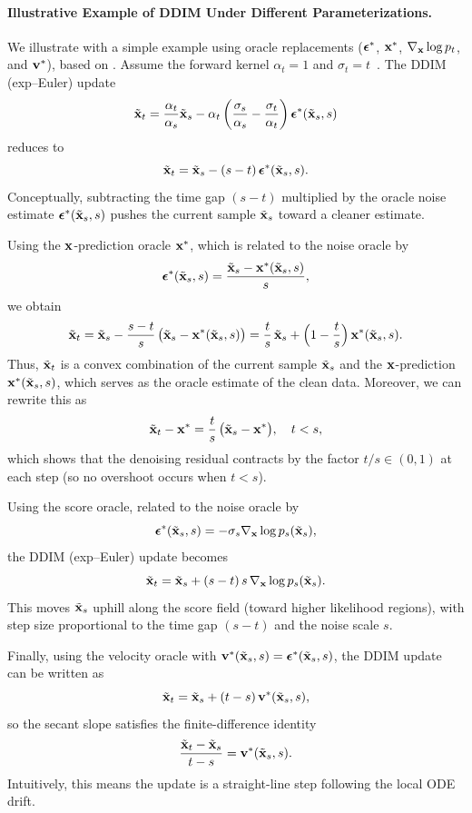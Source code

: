 \paragraph{Illustrative Example of DDIM Under Different Parameterizations.}
We illustrate with a simple example using oracle replacements (${\bm{\epsilon}}^*$, ${\mathbf{x}}^*$, $\nabla_{\mathbf{x}}\log p_t$, and ${\mathbf{v}}^*$), based on .  
Assume the forward kernel $\alpha_t=1$ and $\sigma_t=t$~\citep{karras2022elucidating}. The DDIM (exp--Euler) update
\[
\tilde{{\mathbf{x}}}_{t} = \frac{\alpha_{t}}{\alpha_{s}}\tilde{{\mathbf{x}}}_{s}
- \alpha_{t} \left(\frac{\sigma_{s}}{\alpha_{s}} - \frac{\sigma_{t}}{\alpha_{t}}\right)
{\bm{\epsilon}}^*(\tilde{{\mathbf{x}}}_{s}, s)
\]
reduces to
\[
\tilde{{\mathbf{x}}}_t = \tilde{{\mathbf{x}}}_s - (s-t)\,{\bm{\epsilon}}^*(\tilde{{\mathbf{x}}}_s,s).
\]
Conceptually, subtracting the time gap $(s-t)$ multiplied by the oracle noise estimate 
${\bm{\epsilon}}^*(\tilde{{\mathbf{x}}}_s,s)$ pushes the current sample $\tilde{{\mathbf{x}}}_s$ toward a cleaner estimate.

Using the ${\mathbf{x}}$-prediction oracle ${\mathbf{x}}^*$, which is related to the noise oracle by
\[
{\bm{\epsilon}}^*(\tilde{{\mathbf{x}}}_s,s) = \frac{\tilde{{\mathbf{x}}}_s - {\mathbf{x}}^*(\tilde{{\mathbf{x}}}_s, s)}{s},
\]
we obtain
\begin{align}\label{eq:ctm-formulation}
    \tilde{{\mathbf{x}}}_t
 = \tilde{{\mathbf{x}}}_s - \frac{s-t}{s}\,\bigl(\tilde{{\mathbf{x}}}_s - {\mathbf{x}}^*(\tilde{{\mathbf{x}}}_s, s)\bigr)
 = \frac{t}{s}\,\tilde{{\mathbf{x}}}_s + \Bigl(1-\frac{t}{s}\Bigr)\,{\mathbf{x}}^*(\tilde{{\mathbf{x}}}_s, s).
\end{align}
Thus, $\tilde{{\mathbf{x}}}_t$ is a convex combination of the current sample $\tilde{{\mathbf{x}}}_s$ and the ${\mathbf{x}}$-prediction ${\mathbf{x}}^*(\tilde{{\mathbf{x}}}_s, s)$, which serves as the oracle estimate of the clean data. Moreover, we can rewrite this as
\[
\tilde{{\mathbf{x}}}_t-{\mathbf{x}}^* = \frac{t}{s}\,\bigl(\tilde{{\mathbf{x}}}_s-{\mathbf{x}}^*\bigr),\quad t<s,
\]
which shows that the denoising residual contracts by the factor $t/s\in(0,1)$ at each step (so no overshoot occurs when $t<s$).

Using the score oracle, related to the noise oracle by
\[
{\bm{\epsilon}}^*(\tilde{{\mathbf{x}}}_s, s) = -\sigma_s \nabla_{{\mathbf{x}}}\log p_s(\tilde{{\mathbf{x}}}_s),
\]
the DDIM (exp--Euler) update becomes
\[
\tilde{{\mathbf{x}}}_t = \tilde{{\mathbf{x}}}_s + (s-t)\,s\,\nabla_{{\mathbf{x}}}\log p_s(\tilde{{\mathbf{x}}}_s).
\]
This moves $\tilde{{\mathbf{x}}}_s$ uphill along the score field (toward higher likelihood regions), with step size proportional to the time gap $(s-t)$ and the noise scale $s$.

Finally, using the velocity oracle with ${\mathbf{v}}^*(\tilde{{\mathbf{x}}}_s,s) = {\bm{\epsilon}}^*(\tilde{{\mathbf{x}}}_s,s)$, the DDIM update can be written as
\[
\tilde{{\mathbf{x}}}_t = \tilde{{\mathbf{x}}}_s + (t-s)\,{\mathbf{v}}^*(\tilde{{\mathbf{x}}}_s,s),
\]
so the secant slope satisfies the finite-difference identity
\[
\frac{\tilde{{\mathbf{x}}}_t-\tilde{{\mathbf{x}}}_s}{t-s} = {\mathbf{v}}^*(\tilde{{\mathbf{x}}}_s,s).
\]
Intuitively, this means the update is a straight-line step following the local ODE drift.


